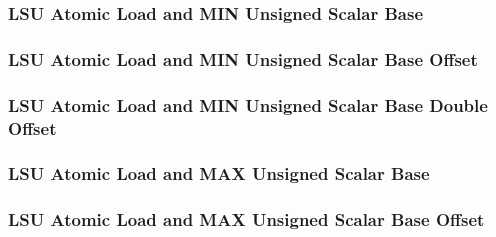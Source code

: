 

\subsubsection[{\small LSU Atomic Load and MIN Unsigned Scalar Base}]{LSU Atomic Load and MIN Unsigned Scalar Base} \label{sec:format-LSU-ALMINUSB}



\subsubsection[{\small LSU Atomic Load and MIN Unsigned Scalar Base Offset}]{LSU Atomic Load and MIN Unsigned Scalar Base Offset} \label{sec:format-LSU-ALMINUSB.O}



\subsubsection[{\small LSU Atomic Load and MIN Unsigned Scalar Base Double Offset}]{LSU Atomic Load and MIN Unsigned Scalar Base Double Offset} \label{sec:format-LSU-ALMINUSB.D}



\subsubsection[{\small LSU Atomic Load and MAX Unsigned Scalar Base}]{LSU Atomic Load and MAX Unsigned Scalar Base} \label{sec:format-LSU-ALMAXUSB}



\subsubsection[{\small LSU Atomic Load and MAX Unsigned Scalar Base Offset}]{LSU Atomic Load and MAX Unsigned Scalar Base Offset} \label{sec:format-LSU-ALMAXUSB.O}

